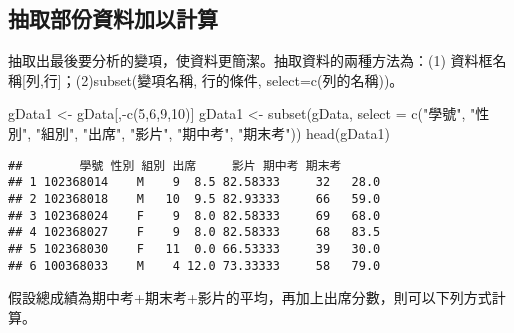\documentclass[
]{book}
\newenvironment{Shaded}{\begin{snugshade}}{\end{snugshade}}
\newcommand{\AttributeTok}[1]{\textcolor[rgb]{0.77,0.63,0.00}{#1}}
\newcommand{\DecValTok}[1]{\textcolor[rgb]{0.00,0.00,0.81}{#1}}
\newcommand{\FunctionTok}[1]{\textcolor[rgb]{0.00,0.00,0.00}{#1}}
\newcommand{\NormalTok}[1]{#1}
\newcommand{\OtherTok}[1]{\textcolor[rgb]{0.56,0.35,0.01}{#1}}
\newcommand{\SpecialCharTok}[1]{\textcolor[rgb]{0.00,0.00,0.00}{#1}}
\newcommand{\StringTok}[1]{\textcolor[rgb]{0.31,0.60,0.02}{#1}}
\begin{document}
\hypertarget{ux62bdux53d6ux90e8ux4efdux8cc7ux6599ux52a0ux4ee5ux8a08ux7b97}{%
\subsection{抽取部份資料加以計算}\label{ux62bdux53d6ux90e8ux4efdux8cc7ux6599ux52a0ux4ee5ux8a08ux7b97}}

抽取出最後要分析的變項，使資料更簡潔。抽取資料的兩種方法為：(1) 資料框名稱{[}列,行{]}；(2)subset(變項名稱, 行的條件, select=c(列的名稱))。

\begin{Shaded}
\begin{Highlighting}[]
\NormalTok{gData1 }\OtherTok{\textless{}{-}}\NormalTok{ gData[,}\SpecialCharTok{{-}}\FunctionTok{c}\NormalTok{(}\DecValTok{5}\NormalTok{,}\DecValTok{6}\NormalTok{,}\DecValTok{9}\NormalTok{,}\DecValTok{10}\NormalTok{)]}
\NormalTok{gData1 }\OtherTok{\textless{}{-}} \FunctionTok{subset}\NormalTok{(gData, }\AttributeTok{select =} \FunctionTok{c}\NormalTok{(}\StringTok{"學號"}\NormalTok{, }\StringTok{"性別"}\NormalTok{, }\StringTok{"組別"}\NormalTok{, }\StringTok{"出席"}\NormalTok{, }\StringTok{"影片"}\NormalTok{, }\StringTok{"期中考"}\NormalTok{, }\StringTok{"期末考"}\NormalTok{))}
\FunctionTok{head}\NormalTok{(gData1)}
\end{Highlighting}
\end{Shaded}

\begin{verbatim}
##        學號 性別 組別 出席     影片 期中考 期末考
## 1 102368014    M    9  8.5 82.58333     32   28.0
## 2 102368018    M   10  9.5 82.93333     66   59.0
## 3 102368024    F    9  8.0 82.58333     69   68.0
## 4 102368027    F    9  8.0 82.58333     68   83.5
## 5 102368030    F   11  0.0 66.53333     39   30.0
## 6 100368033    M    4 12.0 73.33333     58   79.0
\end{verbatim}

假設總成績為期中考+期末考+影片的平均，再加上出席分數，則可以下列方式計算。

\begin{Shaded}
\end{Shaded}
\end{document}

